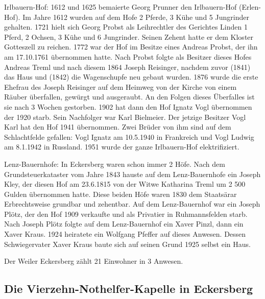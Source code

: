 \documentclass{book}
\begin{document}
Irlbauern-Hof: 1612 und 1625 bemaierte Georg Prunner den Irlbauern-Hof
(Erlen-Hof). Im Jahre 1612 wurden auf dem Hofe 2 Pferde, 3 Kühe und 5 Jungrinder
gehalten. 1721 hielt sich Georg Probst als Leihrechtler des Gerichtes Linden 1
Pferd, 2 Ochsen, 3 Kühe und 6 Jungrinder. Seinen Zehent hatte er dem Kloster
Gotteszell zu reichen. 1772 war der Hof im Besitze eines Andreas Probst, der ihn
am 17.10.1761 übernommen hatte. Nach Probst folgte als Besitzer dieses Hofes
Andreas Treml und nach diesem 1864 Joseph Reisinger, nachdem zuvor (1841) das
Haus und (1842) die Wagenschupfe neu gebaut wurden. 1876 wurde die erste Ehefrau
des Joseph Reisinger auf dem Heimweg von der Kirche von einem Räuber überfallen,
gewürgt und ausgeraubt. An den Folgen dieses Überfalles ist sie nach 3 Wochen
gestorben. 1902 hat dann den Hof Ignatz Vogl übernommen der 1920 starb. Sein
Nachfolger war Karl Bielmeier. Der jetzige Besitzer Vogl Karl hat den Hof 1941
übernommen. Zwei Brüder von ihm sind auf dem Schlachtfelde gefallen: Vogl Ignatz
am 10.5.1940 in Frankreich und Vogl Ludwig am 8.1.1942 in Russland. 1951 wurde
der ganze Irlbauern-Hof elektrifiziert.

Lenz-Bauernhofe: In Eckersberg waren schon immer 2 Höfe. Nach dem
Grundsteuerkataster vom Jahre 1843 hauste auf dem Lenz-Bauernhofe ein Joseph
Kley, der diesen Hof am 23.6.1815 von der Witwe Katharina Treml um 2 500 Gulden
übernommen hatte. Diese beiden Höfe waren 1830 dem Staatsärar Erbrechtsweise
grundbar und zehentbar. Auf dem Lenz-Bauernhof war ein Joseph Plötz, der den Hof
1909 verkaufte und als Privatier in Ruhmannsfelden starb. Nach Joseph Plötz
folgte auf dem Lenz-Bauernhof ein Xaver Pinzl, dann ein Xaver Kraus. 1924
heiratete ein Wolfgang Pfeffer auf dieses Anwesen. Dessen Schwiegervater Xaver
Kraus baute sich auf seinen Grund 1925 selbst ein Haus.

Der Weiler Eckersberg zählt 21 Einwohner in 3 Anwesen.

\subsection{Die Vierzehn-Nothelfer-Kapelle in Eckersberg}
\end{document}

